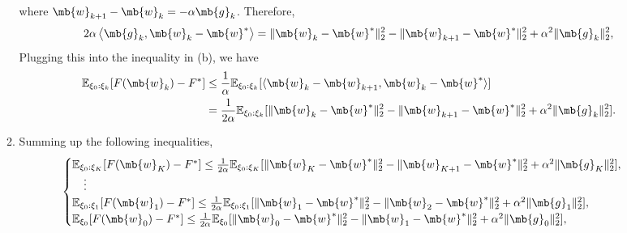 \begin{exercise}
\begin{enumerate}
\begin{solution}
\begin{enumerate}
                        where $\mb{w}_{k+1} - \mb{w}_k = -\alpha\mb{g}_k$. Therefore,
                        \begin{align*}
                            2 \alpha \left\langle \mb{g}_k, \mb{w}_k - \mb{w}^* \right\rangle = \|\mb{w}_k - \mb{w}^*\|_2^2 - \|\mb{w}_{k+1} - \mb{w}^*\|_2^2 + \alpha^2\|\mb{g}_k\|_2^2,
                        \end{align*}
                        Plugging this into the inequality in (b), we have
                        \begin{align*}
                            \mathbb{E}_{\xi_0:\xi_{k}}[F(\mb{w}_{k})-F^*] & \le \frac{1}{\alpha}\mathbb{E}_{\xi_0:\xi_{k}}[\langle{\mb{w}_k - \mb{w}_{k+1}, \mb{w}_{k}-\mb{w}^*}\rangle]                          \\
                                                                          & = \frac{1}{2\alpha}\mathbb{E}_{\xi_0:\xi_{k}}[\|\mb{w}_k-\mb{w}^*\|_2^2 - \|\mb{w}_{k+1}-\mb{w}^*\|_2^2 + \alpha^2 \|\mb{g}_k\|_2^2].
                        \end{align*}
                    \item Summing up the following inequalities,
                        \begin{align*}
                            \begin{cases}
                                \mathbb{E}_{\xi_0:\xi_{K}}[F(\mb{w}_K)-F^*]\leq\frac{1}{2\alpha}\mathbb{E}_{\xi_0:\xi_{K}}[\|\mb{w}_K-\mb{w}^*\|_2^2 - \|\mb{w}_{K+1}-\mb{w}^*\|_2^2 + \alpha^2 \|\mb{g}_K\|_2^2], \\
                                \quad \vdots                                                                                                                                                                       \\
                                \mathbb{E}_{\xi_0:\xi_{1}}[F(\mb{w}_1)-F^*]\leq\frac{1}{2\alpha}\mathbb{E}_{\xi_0:\xi_1}[\|\mb{w}_1-\mb{w}^*\|_2^2 - \|\mb{w}_{2}-\mb{w}^*\|_2^2 + \alpha^2 \|\mb{g}_1\|_2^2],     \\
                                \mathbb{E}_{\xi_0}[F(\mb{w}_0)-F^*]\leq\frac{1}{2\alpha}\mathbb{E}_{\xi_0}[\|\mb{w}_0-\mb{w}^*\|_2^2 - \|\mb{w}_{1}-\mb{w}^*\|_2^2 + \alpha^2 \|\mb{g}_0\|_2^2],                   \\

\end{cases}
\end{align*}
\end{enumerate}
\end{solution}
\end{enumerate}
\end{exercise}
